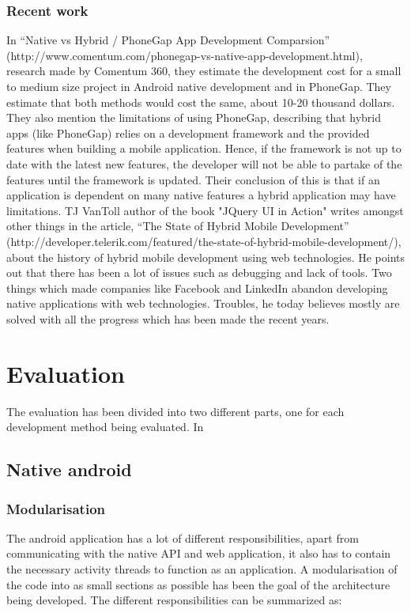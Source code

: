\documentclass{./tex/cslthse-msc}
\begin{document}
\subsection{Recent work}
In “Native vs Hybrid / PhoneGap App Development Comparsion” (http://www.comentum.com/phonegap-vs-native-app-development.html), research made by Comentum 360, they estimate the development cost for a small to medium size project in Android native development and in PhoneGap. They estimate that both methods would cost the same, about 10-20 thousand dollars. They also mention the limitations of using PhoneGap, describing that hybrid apps (like PhoneGap) relies on a development framework and the provided features when building a mobile application. Hence, if the framework is not up to date with the latest new features, the developer will not be able to partake of the features until the framework is updated. Their conclusion of this is that if an application is dependent on many native features a hybrid application may have limitations. 
\newline
\newline
TJ VanToll author of the book "JQuery UI in Action" writes amongst other things in the article, “The State of Hybrid Mobile Development” (http://developer.telerik.com/featured/the-state-of-hybrid-mobile-development/), about the history of hybrid mobile development using web technologies. He points out that there has been a lot of issues such as debugging and lack of tools. Two things which made companies like Facebook and LinkedIn abandon developing native applications with web technologies. Troubles, he today believes mostly are solved with all the progress which has been made the recent years.

\chapter{Evaluation}
The evaluation has been divided into two different parts, one for each development method being evaluated. In 
\section{Native android} \label{android}
\subsection{Modularisation}
The android application has a lot of different responsibilities, apart from communicating with the native API and web application, it also has to contain the necessary activity threads to function as an application. A modularisation of the code into as small sections as possible has been the goal of the architecture being developed. The different responsibilities can be summarized as:
\end{document}

